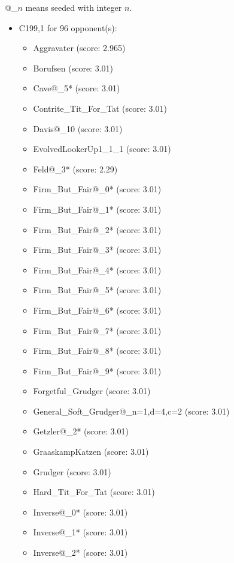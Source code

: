 \begin{appendices}
    @\_$n$ means seeded with integer $n$.
    \begin{itemize}\item C199,1 for 96 opponent(s):
    \begin{multicols}{3}
         \begin{itemize}
            \item Aggravater (score: 2.965)
            \item Borufsen (score: 3.01)
            \item Cave@\_5* (score: 3.01)
            \item Contrite\_Tit\_For\_Tat (score: 3.01)
            \item Davis@\_10 (score: 3.01)
            \item EvolvedLookerUp1\_1\_1 (score: 3.01)
            \item Feld@\_3* (score: 2.29)
            \item Firm\_But\_Fair@\_0* (score: 3.01)
            \item Firm\_But\_Fair@\_1* (score: 3.01)
            \item Firm\_But\_Fair@\_2* (score: 3.01)
            \item Firm\_But\_Fair@\_3* (score: 3.01)
            \item Firm\_But\_Fair@\_4* (score: 3.01)
            \item Firm\_But\_Fair@\_5* (score: 3.01)
            \item Firm\_But\_Fair@\_6* (score: 3.01)
            \item Firm\_But\_Fair@\_7* (score: 3.01)
            \item Firm\_But\_Fair@\_8* (score: 3.01)
            \item Firm\_But\_Fair@\_9* (score: 3.01)
            \item Forgetful\_Grudger (score: 3.01)
            \item General\_Soft\_Grudger@\_n=1,d=4,c=2 (score: 3.01)
            \item Getzler@\_2* (score: 3.01)
            \item GraaskampKatzen (score: 3.01)
            \item Grudger (score: 3.01)
            \item Hard\_Tit\_For\_Tat (score: 3.01)
            \item Inverse@\_0* (score: 3.01)
            \item Inverse@\_1* (score: 3.01)
            \item Inverse@\_2* (score: 3.01)

\end{itemize}
\end{multicols}
\end{itemize}
\end{appendices}
